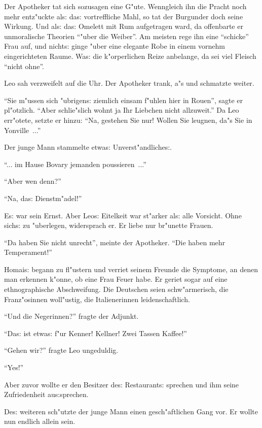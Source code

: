 \documentclass[oneside,12pt]{book}
\newenvironment{antiqua}{\normalfont}{}%
\newcommand{\s}{s:}%
\begin{document}
Der Apotheker tat sich sozusagen eine G"ute. Wenngleich ihn die
Pracht noch mehr ent\/z"uckte al{\s} da{\s} vortreffliche Mahl, so
tat der Burgunder doch seine Wirkung. Und al{\s} da{\s} Omelett
mit Rum aufgetragen ward, da offenbarte er unmoralische Theorien
"`"uber die Weiber"'. Am meisten rege ihn eine "`schicke"' Frau
auf, und nicht{\s} ginge "uber eine elegante Robe in einem vornehm
eingerichteten Raume. Wa{\s} die k"orperlichen Reize anbelange, da
sei viel Fleisch "`nicht ohne"'.

Leo sah verzweifelt auf die Uhr. Der Apotheker trank, a"s und
schmatzte weiter.

"`Sie m"ussen sich "ubrigen{\s} ziemlich einsam f"uhlen hier in
Rouen"', sagte er pl"otzlich. "`Aber schlie"slich wohnt ja Ihr
Liebchen nicht allzuweit."' Da Leo err"otete, setzte er hinzu:
"`Na, gestehen Sie nur! Wollen Sie leugnen, da"s Sie in
Yonville~..."'

Der junge Mann stammelte etwa{\s} Unverst"andliche{\s}.

"`... im Hause Bovary jemanden poussieren~..."'

"`Aber wen denn?"'

"`Na, da{\s} Dienstm"adel!"'

E{\s} war sein Ernst. Aber Leo{\s} Eitelkeit war st"arker al{\s}
alle Vorsicht. Ohne sich{\s} zu "uberlegen, widersprach er. Er
liebe nur br"unette Frauen.

"`Da haben Sie nicht unrecht"', meinte der Apotheker. "`Die haben
mehr Temperament!"'

Homai{\s} begann zu fl"ustern und verriet seinem Freunde die
Symptome, an denen man erkennen k"onne, ob eine Frau Feuer habe.
Er geriet sogar auf eine ethnographische Abschweifung. Die
Deutschen seien schw"armerisch, die Franz"osinnen woll"ustig, die
Italienerinnen leidenschaftlich.

"`Und die Negerinnen?"' fragte der Adjunkt.

"`Da{\s} ist etwa{\s} f"ur Kenner! Kellner! Zwei Tassen Kaffee!"'

"`Gehen wir?"' fragte Leo ungeduldig.

"`\begin{antiqua}Yes!\end{antiqua}"'

Aber zuvor wollte er den Besitzer de{\s} Restaurant{\s} sprechen
und ihm seine Zufriedenheit au{\s}sprechen.

De{\s} weiteren sch"utzte der junge Mann einen gesch"aftlichen
Gang vor. Er wollte nun endlich allein sein.
\end{document}
